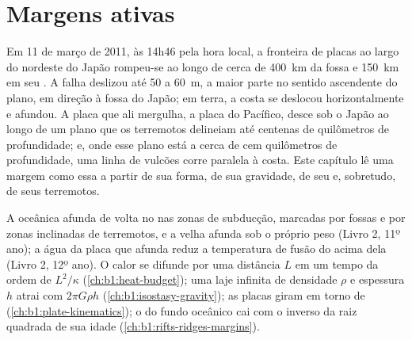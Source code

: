 \chapter{Margens ativas}\label{ch:b1:active-margins}

Em 11 de março de 2011, às 14h46 pela hora local, a fronteira de placas ao largo do nordeste do Japão rompeu-se ao longo de cerca de \qty{400}{km} da fossa e \qty{150}{km} em seu . A falha deslizou até 50 a \qty{60}{m}, a maior parte no sentido ascendente do plano, em direção à fossa do Japão; em terra, a costa se deslocou horizontalmente e afundou. A placa que ali mergulha, a placa do Pacífico, desce sob o Japão ao longo de um plano que os terremotos delineiam até centenas de quilômetros de profundidade; e, onde esse plano está a cerca de cem quilômetros de profundidade, uma linha de vulcões corre paralela à costa. Este capítulo lê uma margem como essa a partir de sua forma, de sua gravidade, de seu  e, sobretudo, de seus terremotos.

\begin{recall}
A  oceânica afunda de volta no  nas zonas de subducção, marcadas por fossas e por zonas inclinadas de terremotos, e a  velha afunda sob o próprio peso (Livro 2, 11º ano); a água da placa que afunda reduz a temperatura de fusão do  acima dela (Livro 2, 12º ano). O calor se difunde por uma distância $L$ em um tempo da ordem de $L^2/\kappa$ (\cref{ch:b1:heat-budget}); uma laje infinita de densidade $\rho$ e espessura $h$ atrai com $2\pi G\rho h$ (\cref{ch:b1:isostasy-gravity}); as placas giram em torno de  (\cref{ch:b1:plate-kinematics}); o  do fundo oceânico cai com o inverso da raiz quadrada de sua idade (\cref{ch:b1:rifts-ridges-margins}).
\end{recall}

